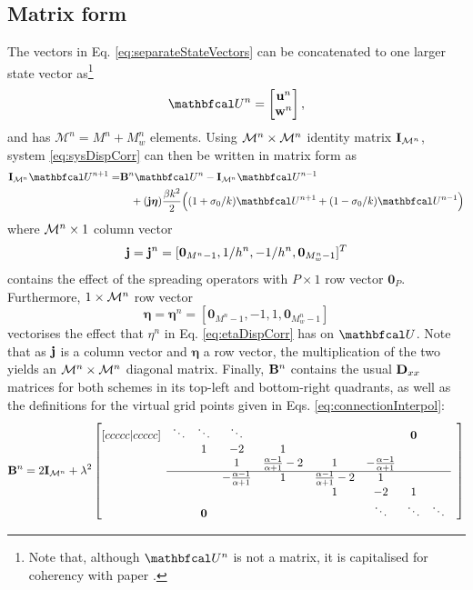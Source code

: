 \subsection{Matrix form}
The vectors in Eq. \eqref{eq:separateStateVectors} can be concatenated to one larger state vector as\footnote{Note that, although $\Ucal^n$ is not a matrix, it is capitalised for coherency with paper \citeP[G].}
\begin{equation}\label{eq:fullState}
    \Ucal^n = \begin{bmatrix}
        \mathbf{u}^n \\
        \mathbf{w}^n
    \end{bmatrix},
\end{equation}
and has $\mathcal{M}^n = M^n+M_w^n$ elements. 
Using ${\mathcal{M}^n} \times {\mathcal{M}^n}$ identity matrix $\mathbf{I}_{\mathcal{M}^n}$, system \eqref{eq:sysDispCorr} can then be written in matrix form as
\begin{equation}\label{eq:intermediateMatrixFormDynamic}
    \begin{aligned}
        \I_\fullMn\Ucal^{n+1} = &\B^n\Ucal^n - \I_\fullMn\Ucal^{n-1} \\
        &\quad+ (\j\boldsymbol{\eta})\frac{\beta k^2}{2}\Big((1+\sigma_0/k)\Ucal^{n+1} + (1-\sigma_0/k)\Ucal^{n-1}\Big)
    \end{aligned}
\end{equation}
where ${\mathcal{M}^n} \times 1$ column vector
\begin{equation*}
    \mathbf{j} = \mathbf{j}^n = [\mathbf{0}_{M^n-1}, 1/h^n, -1/h^n, \mathbf{0}_{M_w^n-1}]^T
\end{equation*}
contains the effect of the spreading operators with $P\times 1$ row vector $\mathbf{0}_P$. Furthermore, $1\times {\mathcal{M}^n}$ row vector
\begin{equation*}
    \boldsymbol{\eta} = \boldsymbol{\eta}^n = [\mathbf{0}_{M^n-1}, -1, 1, \mathbf{0}_{M_w^n-1}]
\end{equation*}
vectorises the effect that $\eta^n$ in Eq. \eqref{eq:etaDispCorr} has on $\Ucal$. Note that as $\mathbf{j}$ is a column vector and $\boldsymbol{\eta}$ a row vector, the multiplication of the two yields an ${\mathcal{M}^n}\times{\mathcal{M}^n}$ diagonal matrix. Finally, $\mathbf{B}^n$ contains the usual $\mathbf{D}_{xx}$ matrices for both schemes in its top-left and bottom-right quadrants, as well as the definitions for the virtual grid points given in Eqs. \eqref{eq:connectionInterpol}:
\begin{equation*}\label{eq:quadMat}
    \mathbf{B}^n = 2\I_\fullMn + \lambda^2\begin{bmatrix}[ccccc|ccccc]
     & \ddots& \ddots  &\ddots & & & & \mathbf{0} & & \\
      & & 1 & -2 & 1 & & & & & \\
     & & & 1 & \frac{\alpha - 1}{\alpha + 1} -2& 1 & -\frac{\alpha - 1}{\alpha + 1} & & \\ \cline{2-9}
     & & & -\frac{\alpha - 1}{\alpha + 1} & 1 & \frac{\alpha - 1}{\alpha + 1} -2 & 1 & & & \\
        & & & & &1 & -2 & 1 & & \\
       & & \mathbf{0} & & &  &\ddots & \ddots &\ddots &
    \end{bmatrix}
\end{equation*}
